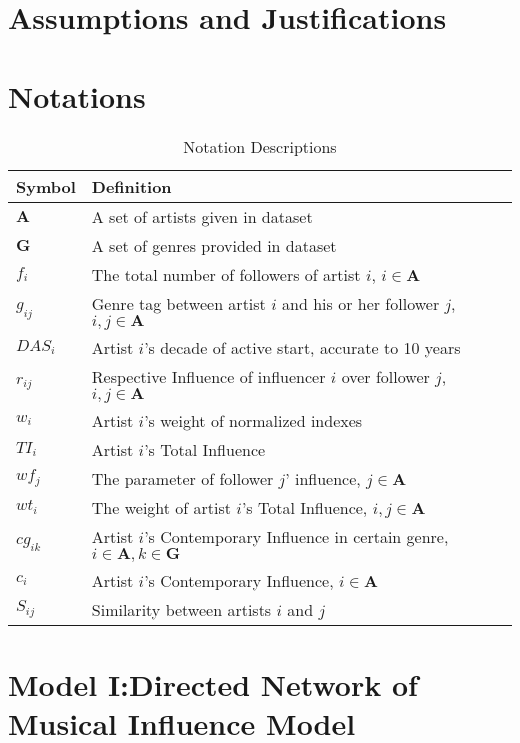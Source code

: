 \documentclass{mcmthesis}
\numberwithin{figure}{section}
\numberwithin{table}{section}
\numberwithin{equation}{section}
\begin{document}
\section{Assumptions and Justifications}



\section{Notations}

\renewcommand\arraystretch{1.5}

\begin{table}[ht]
  \centering
  \caption{Notation Descriptions} \label{Varibles}
  \begin{tabular}{m{2.5cm}<{\centering}|m{12.5cm}<{\centering}}
  \toprule[1.5pt]
  \textbf{Symbol} & \textbf{Definition} \\ \hline
  $\mathbf{A}$ & A set of artists given in dataset \\
  $\mathbf{G}$ & A set of genres provided in dataset \\
  $f_i$ & The total number of followers of artist $i$, $i\in \mathbf{A}$ \\
  $g_{ij}$ & Genre tag between artist $i$ and his or her follower $j$, $i,j \in \mathbf{A}$ \\
  $DAS_{i}$ & Artist $i$'s decade of active start, accurate to 10 years \\
  $r_{ij}$ & Respective Influence of influencer $i$ over follower $j$, $i,j \in \mathbf{A}$ \\
  $w_{i}$ & Artist $i$'s weight of normalized indexes \\ 
  $TI_{i} $ & Artist $i$'s Total Influence \\
  $wf_j$ & The parameter of follower $j$' influence, $j\in \mathbf{A}$ \\
  $wt_{i}$ & The weight of artist $i$'s Total Influence, $i,j\in \mathbf{A}$\\
  $cg_{ik}$ & Artist $i$'s Contemporary Influence in certain genre, $i\in \mathbf{A}, k \in \mathbf{G}$ \\
  $c_{i}$ & Artist $i$'s Contemporary Influence, $i\in \mathbf{A}$ \\
  $S_{ij} $ & Similarity between artists $i$ and $j$ \\
  \bottomrule[1.5pt]
  \end{tabular}
  \end{table}




\section{Model I:Directed Network of Musical Influence Model}
\end{document}
